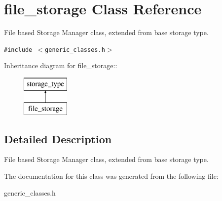 \section{file\_\-storage Class Reference}
\label{classfile__storage}
File based Storage Manager class, extended from base storage type.  


{\tt \#include $<$generic\_\-classes.h$>$}

Inheritance diagram for file\_\-storage::\begin{figure}[H]
\begin{center}
\leavevmode
\includegraphics[height=2cm]{classfile__storage}
\end{center}
\end{figure}


\subsection{Detailed Description}
File based Storage Manager class, extended from base storage type. 



The documentation for this class was generated from the following file:\begin{CompactItemize}
\item 
generic\_\-classes.h\end{CompactItemize}
